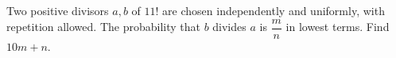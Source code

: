 Two positive divisors $a,b$ of $11!$ are chosen independently and uniformly, with repetition allowed. The probability that $b$ divides $a$ is $\dfrac{m}{n}$ in lowest terms. Find $10m+n$.

